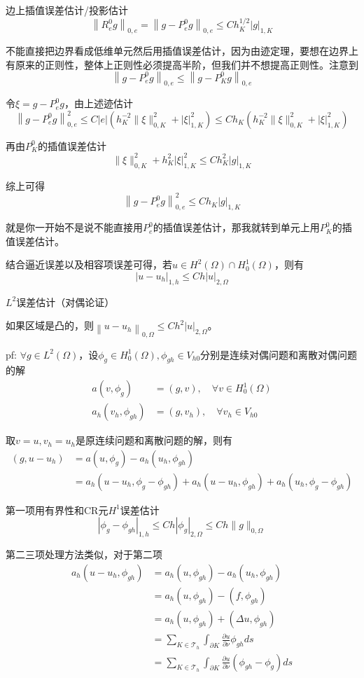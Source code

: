 边上插值误差估计/投影估计
\[
  \left\|R_e^0 g\right\|_{0, e} = \left\|g-P_{e}^{0} g\right\|_{0, e} \le C h_{K}^{1 / 2}|g|_{1, K}
\]

不能直接把边界看成低维单元然后用插值误差估计，因为由迹定理，要想在边界上有原来的正则性，整体上正则性必须提高半阶，但我们并不想提高正则性。注意到
\[
  \left\|g-P_{e}^{0} g\right\|_{0, e} \le \left\|g-P_{K}^{0} g\right\|_{0, e}
\]

令$\xi = g-P_{e}^{0} g$，由上述迹估计
\[
  \left\|g-P_{e}^{0} g\right\|_{0, e}^{2} \le C|e|\left(h_{K}^{-2}\|\xi\|_{0, K}^{2}+|\xi|_{1, K}^{2}\right) \le C h_K \left(h_{K}^{-2}\|\xi\|_{0, K}^{2}+|\xi|_{1, K}^{2}\right)
\]

再由$P_K^0$的插值误差估计
\[
  \|\xi\|_{0, K}^{2}+h_{K}^{2}|\xi|_{1, K}^{2} \le C h_{K}^{2}|g|_{1, K}
\]

综上可得
\[
  \left\|g-P_{e}^{0} g\right\|_{0, e}^2 \le C h_{K}|g|_{1, K}
\]

就是你一开始不是说不能直接用$P_e^0$的插值误差估计，那我就转到单元上用$P_K^0$的插值误差估计。

结合逼近误差以及相容项误差可得，若$u \in H^2(\Omega)\cap H_0^1(\Omega)$，则有
\[
  |u-u_h|_{1, h} \le C h|u|_{2, \Omega}
\]

$L^2$误差估计（对偶论证）

如果区域是凸的，则$\left\|u-u_{h}\right\|_{0, \Omega} \le C h^{2}|u|_{2, \Omega}$。

pf: $\forall g \in L^2(\Omega)$，设$\phi_g \in H_0^1(\Omega), \phi_{gh} \in V_{h0}$分别是连续对偶问题和离散对偶问题的解
\[
  \begin{aligned}
    a\left(v, \phi_{g}\right)&=(g, v), \quad \forall v \in H_{0}^{1}(\Omega) \\
    a_{h}\left(v_{h}, \phi_{g h}\right)&=\left(g, v_{h}\right), \quad \forall v_h \in V_{h 0}
  \end{aligned}
\]

取$v = u, v_h = u_h$是原连续问题和离散问题的解，则有
\[
  \begin{aligned}
    (g, u-u_{h})&=a(u, \phi_{g})-a_{h}(u_{h}, \phi_{g h}) \\
    &=a_{h}(u-u_{h}, \phi_{g}-\phi_{g h})+a_{h}(u-u_{h}, \phi_{g h})+a_{h}(u_{h}, \phi_{g}-\phi_{g h})
  \end{aligned}
\]

第一项用有界性和CR元$H^1$误差估计
\[
  \left|\phi_{g}-\phi_{g h}\right|_{1, h} \le C h\left|\phi_{g}\right|_{2, \Omega} \le C h\|g\|_{0, \Omega}
\]

第二三项处理方法类似，对于第二项
\[
  \begin{aligned}
    a_{h}(u-u_{h}, \phi_{g h}) &= a_h(u, \phi_{gh}) - a_h(u_h, \phi_{gh})\\
    &= a_h(u, \phi_{gh}) - (f, \phi_{gh})\\
    &= a_h(u, \phi_{gh}) + (\Delta u, \phi_{gh})\\
    &= \sum_{K \in \mathcal{T}_{h}} \int_{\partial K} \frac{\partial u}{\partial \nu} \phi_{g h} ds\\
    &= \sum_{K \in \mathcal{T}_{h}} \int_{\partial K} \frac{\partial u}{\partial \nu} (\phi_{g h} - \phi_g) ds
  \end{aligned}
\]


